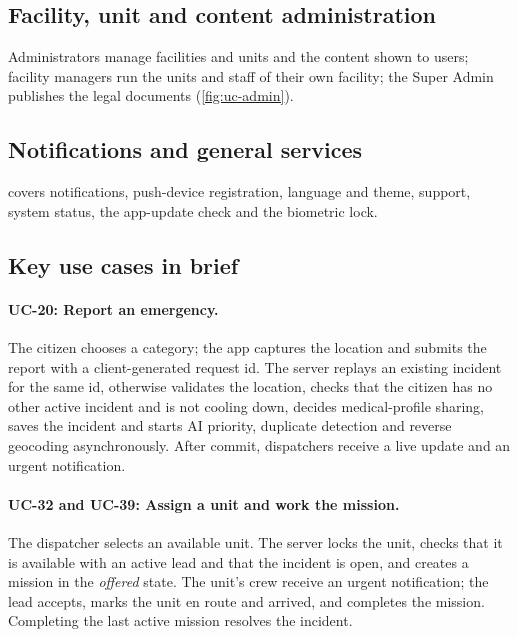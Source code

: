 \subsection{Facility, unit and content administration}
Administrators manage facilities and units and the content shown to users; facility managers run the units and staff
of their own facility; the Super Admin publishes the legal documents (\cref{fig:uc-admin}).

\subsection{Notifications and general services}
 covers notifications, push-device registration, language and theme, support, system status,
the app-update check and the biometric lock.

\subsection{Key use cases in brief}

\paragraph{UC-20: Report an emergency.} The citizen chooses a category; the app captures the location and
submits the report with a client-generated request id. The server replays an existing incident for the same id,
otherwise validates the location, checks that the citizen has no other active incident and is not cooling down,
decides medical-profile sharing, saves the incident and starts AI priority, duplicate detection and reverse
geocoding asynchronously. After commit, dispatchers receive a live update and an urgent notification.

\paragraph{UC-32 and UC-39: Assign a unit and work the mission.} The dispatcher selects an available unit. The
server locks the unit, checks that it is available with an active lead and that the incident is open, and creates
a mission in the \emph{offered} state. The unit's crew receive an urgent notification; the lead accepts, marks the
unit en route and arrived, and completes the mission. Completing the last active mission resolves the incident.

